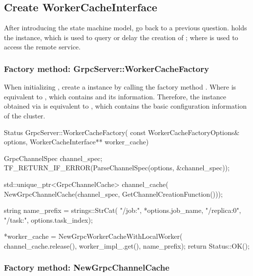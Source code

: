 \begin{content}
\subsection{Create WorkerCacheInterface}

After introducing the  state machine model, go back to a previous question.  holds the  instance, which is used to query or delay the creation of ; where  is used to access the remote  service.

\subsubsection{Factory method: GrpcServer::WorkerCacheFactory}

When initializing , create a  instance by calling the factory method . Where  is equivalent to , which contains  and its  information. Therefore, the  instance obtained via  is equivalent to , which contains the basic configuration information of the cluster.

\begin{leftbar}
\begin{c++}
Status GrpcServer::WorkerCacheFactory(
    const WorkerCacheFactoryOptions& options,
    WorkerCacheInterface** worker_cache) {

  GrpcChannelSpec channel_spec;
  TF_RETURN_IF_ERROR(ParseChannelSpec(options, &channel_spec));

  std::unique_ptr<GrpcChannelCache> channel_cache(
      NewGrpcChannelCache(channel_spec, GetChannelCreationFunction()));

  string name_prefix = strings::StrCat(
      "/job:", *options.job_name, "/replica:0",
      "/task:", options.task_index);

  *worker_cache = NewGrpcWorkerCacheWithLocalWorker(
      channel_cache.release(), worker_impl_.get(), name_prefix);
  return Status::OK();
}
\end{c++}
\end{leftbar}

\subsubsection{Factory method: NewGrpcChannelCache}


\end{content}
